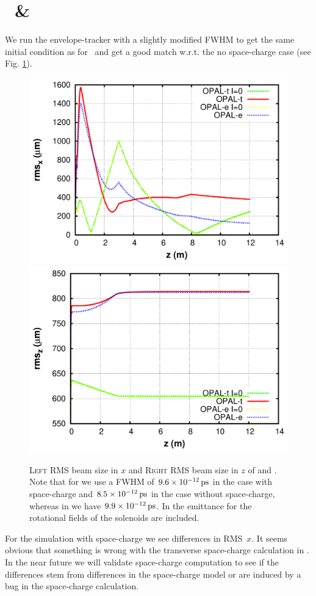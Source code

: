 \documentclass{psi-note}    %
\newcommand{\unit}[2]{$#1\, \rm{#2}$}
\begin{document}
{\section{\opalt\ \& \opale} \label{sec:tt-vs-et}
We run the envelope-tracker with a slightly modified FWHM to get the same
initial condition as for \opalt\ and get a good match w.r.t. the no
space-charge case (see Fig. \ref{fig:tt_et_nosc}).
\begin{figure}[htbp]
\begin{center}
\includegraphics[width=.4\linewidth]{figures/et-tt-xrms}
\includegraphics[width=.4\linewidth]{figures/et-tt-zrms}
\caption{\textsc{Left} RMS beam size in $x$ and \textsc{Right} RMS beam size in $z$
of \opalt and \opale. Note that for \opale we use a FWHM of \unit{9.6
\times 10^{-12}}{ps} in the case with space-charge and \unit{8.5\times10^{-12}}{ps} in the case 
without space-charge, whereas in \opalt we have \unit{9.9\times 10^{-12}}{ps}. In the
emittance for \opalt the rotational fields of the solenoids are included.}
\label{fig:tt_et_nosc}
\end{center}
\end{figure}
For the simulation with space-charge we see differences in RMS~$x$. It seems
obvious that something is wrong with the transverse space-charge calculation in \opale. In
the near future we will validate space-charge computation to see if the
differences stem from differences in the space-charge model or are induced by a
bug in the space-charge calculation.

}
\end{document}
